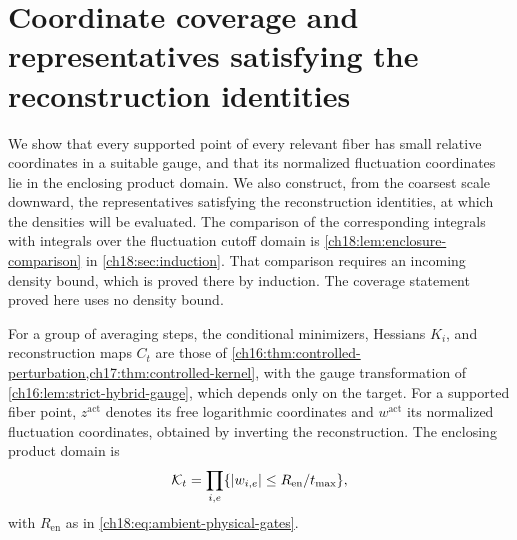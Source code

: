 \section{Coordinate coverage and representatives satisfying the reconstruction identities}\label{ch18:sec:coverage}

We show that every supported point of every relevant fiber has small relative coordinates in a suitable gauge, and that its normalized fluctuation coordinates lie in the enclosing product domain. We also construct, from the coarsest scale downward, the representatives satisfying the reconstruction identities, at which the densities will be evaluated. The comparison of the corresponding integrals with integrals over the fluctuation cutoff domain is \cref{ch18:lem:enclosure-comparison} in \cref{ch18:sec:induction}. That comparison requires an incoming density bound, which is proved there by induction. The coverage statement proved here uses no density bound.

For a group of averaging steps, the conditional minimizers, Hessians $K_i$, and reconstruction maps $C_t$ are those of \cref{ch16:thm:controlled-perturbation,ch17:thm:controlled-kernel}, with the gauge transformation of \cref{ch16:lem:strict-hybrid-gauge}, which depends only on the target. For a supported fiber point, $z^{\mathrm{act}}$ denotes its free logarithmic coordinates and $w^{\mathrm{act}}$ its normalized fluctuation coordinates, obtained by inverting the reconstruction. The enclosing product domain is
\[
 \mathcal K_t=\prod_{i,e}\{\lvert w_{i,e}\rvert\le R_{\mathrm{en}}/t_{\max}\},
\]
with $R_{\mathrm{en}}$ as in \eqref{ch18:eq:ambient-physical-gates}.

